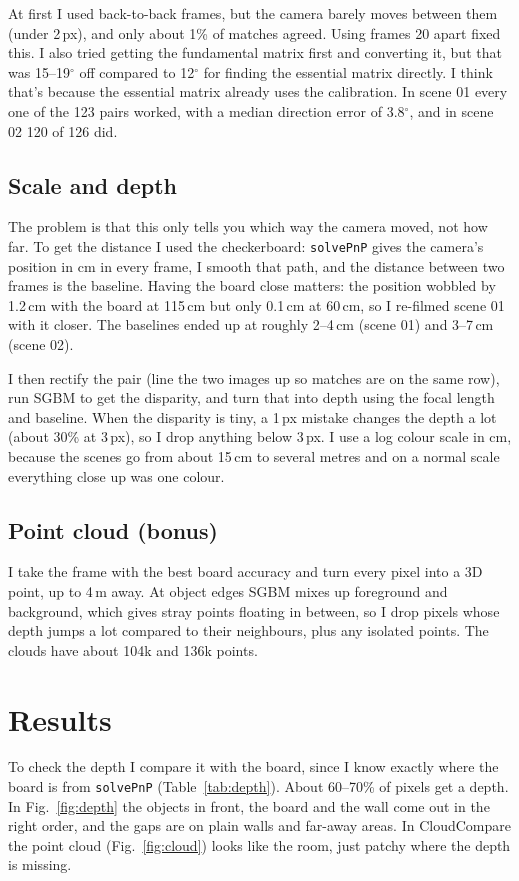 \documentclass[conference]{assets/latex/IEEEtran}
\begin{document}
At first I used back-to-back frames, but the camera barely moves between them
(under 2\,px), and only about 1\% of matches agreed. Using frames 20 apart
fixed this. I also tried getting the fundamental matrix first and converting
it, but that was 15--19$^\circ$ off compared to 12$^\circ$ for finding the
essential matrix directly. I think that's because the essential matrix already
uses the calibration. In scene 01 every one of the 123 pairs worked, with a
median direction error of 3.8$^\circ$, and in scene 02 120 of 126 did.

\subsection{Scale and depth}
The problem is that this only tells you which way the camera moved, not how
far. To get the distance I used the checkerboard: \texttt{solvePnP} gives the
camera's position in cm in every frame, I smooth that path, and the distance
between two frames is the baseline. Having the board close matters: the
position wobbled by 1.2\,cm with the board at 115\,cm but only 0.1\,cm at
60\,cm, so I re-filmed scene 01 with it closer. The baselines ended up at
roughly 2--4\,cm (scene 01) and 3--7\,cm (scene 02).

I then rectify the pair (line the two images up so matches are on the same
row), run SGBM to get the disparity, and turn that into depth using the focal
length and baseline. When the disparity is tiny, a 1\,px mistake changes the
depth a lot (about 30\% at 3\,px), so I drop anything below 3\,px. I use a log
colour scale in cm, because the scenes go from about 15\,cm to several metres
and on a normal scale everything close up was one colour.

\subsection{Point cloud (bonus)}
I take the frame with the best board accuracy and turn every pixel into a 3D
point, up to 4\,m away. At object edges SGBM mixes up foreground and
background, which gives stray points floating in between, so I drop pixels
whose depth jumps a lot compared to their neighbours, plus any isolated
points. The clouds have about 104k and 136k points.

\section{Results}
To check the depth I compare it with the board, since I know exactly where
the board is from \texttt{solvePnP} (Table~\ref{tab:depth}). About 60--70\% of
pixels get a depth. In Fig.~\ref{fig:depth} the objects in front, the board
and the wall come out in the right order, and the gaps are on plain walls and
far-away areas. In CloudCompare the point cloud (Fig.~\ref{fig:cloud}) looks
like the room, just patchy where the depth is missing.
\end{document}
